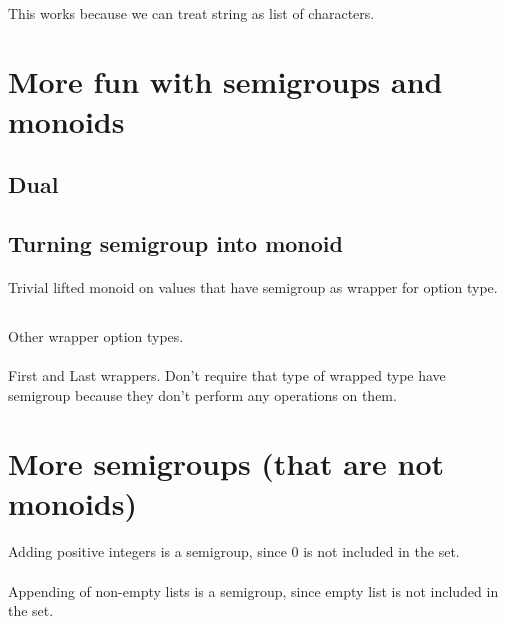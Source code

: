 \documentclass{article}
\begin{document}
    \paragraph{}
    This works because we can treat string as list of characters.

    \section{More fun with semigroups and monoids}
    \subsection{Dual}
    \subsection{Turning semigroup into monoid}

    \paragraph{} 
    Trivial lifted monoid on values that have semigroup as wrapper for option type.

    \subsection{}
    Other wrapper option types.

    \paragraph{}
    First and Last wrappers. Don't require that type of wrapped type have semigroup because they don't perform any operations on them.



    \section{More semigroups (that are not monoids)}

    \paragraph{}
    Adding positive integers is a semigroup, since $0$ is not included in the set.

    \paragraph{}
    Appending of non-empty lists is a semigroup, since empty list is not included in the set.
\end{document}
